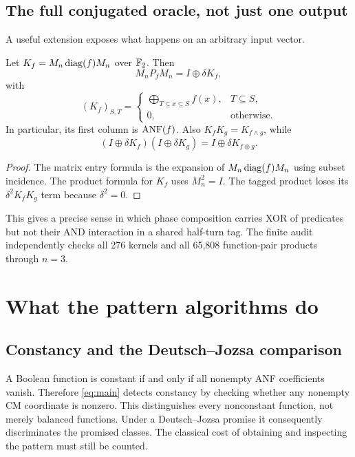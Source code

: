 \subsection{The full conjugated oracle, not just one output}
A useful extension exposes what happens on an arbitrary input vector.
\begin{proposition}\label{prop:interval}
Let $K_f=M_n\operatorname{diag}(f)M_n$ over $\mathbb F_2$. Then
\begin{equation}
 M_nP_fM_n=I\oplus\delta K_f,
\end{equation}
with
\begin{equation}\label{eq:interval}
 (K_f)_{S,T}=
 \begin{cases}
 \displaystyle\bigoplus_{T\subseteq x\subseteq S} f(x),&T\subseteq S,\\
 0,&\text{otherwise}.
 \end{cases}
\end{equation}
In particular, its first column is $\operatorname{ANF}(f)$. Also $K_fK_g=K_{f\land g}$, while
\begin{equation}
 (I\oplus\delta K_f)(I\oplus\delta K_g)
 =I\oplus\delta K_{f\oplus g}.
\end{equation}
\end{proposition}
\begin{proof}
The matrix entry formula is the expansion of $M_n\operatorname{diag}(f)M_n$ using subset incidence. The product formula for $K_f$ uses $M_n^2=I$. The tagged product loses its $\delta^2K_fK_g$ term because $\delta^2=0$.
\end{proof}
This gives a precise sense in which phase composition carries XOR of predicates but not their AND interaction in a shared half-turn tag. The finite audit independently checks all 276 kernels and all 65,808 function-pair products through $n=3$.

\section{What the pattern algorithms do}\label{sec:algorithms}
\subsection{Constancy and the Deutsch--Jozsa comparison}
A Boolean function is constant if and only if all nonempty ANF coefficients vanish. Therefore \cref{eq:main} detects constancy by checking whether any nonempty CM coordinate is nonzero. This distinguishes every nonconstant function, not merely balanced functions. Under a Deutsch--Jozsa promise it consequently discriminates the promised classes. The classical cost of obtaining and inspecting the pattern must still be counted.

